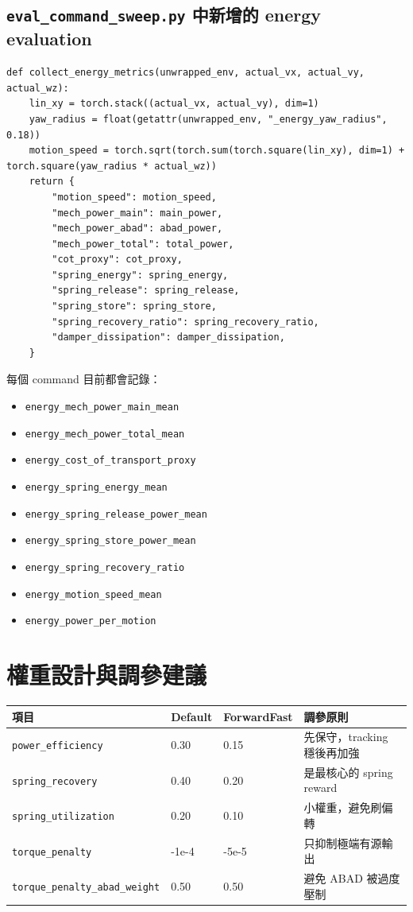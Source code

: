 \documentclass[12pt,a4paper,UTF8]{ctexart}
\begin{document}
\subsection{\texttt{eval\_command\_sweep.py} 中新增的 energy evaluation}

\begin{lstlisting}[style=pythonstyle,caption={energy KPI 收集 helper}]
def collect_energy_metrics(unwrapped_env, actual_vx, actual_vy, actual_wz):
    lin_xy = torch.stack((actual_vx, actual_vy), dim=1)
    yaw_radius = float(getattr(unwrapped_env, "_energy_yaw_radius", 0.18))
    motion_speed = torch.sqrt(torch.sum(torch.square(lin_xy), dim=1) + torch.square(yaw_radius * actual_wz))
    return {
        "motion_speed": motion_speed,
        "mech_power_main": main_power,
        "mech_power_abad": abad_power,
        "mech_power_total": total_power,
        "cot_proxy": cot_proxy,
        "spring_energy": spring_energy,
        "spring_release": spring_release,
        "spring_store": spring_store,
        "spring_recovery_ratio": spring_recovery_ratio,
        "damper_dissipation": damper_dissipation,
    }
\end{lstlisting}

每個 command 目前都會記錄：
\begin{itemize}[leftmargin=2em]
    \item \texttt{energy\_mech\_power\_main\_mean}
    \item \texttt{energy\_mech\_power\_total\_mean}
    \item \texttt{energy\_cost\_of\_transport\_proxy}
    \item \texttt{energy\_spring\_energy\_mean}
    \item \texttt{energy\_spring\_release\_power\_mean}
    \item \texttt{energy\_spring\_store\_power\_mean}
    \item \texttt{energy\_spring\_recovery\_ratio}
    \item \texttt{energy\_motion\_speed\_mean}
    \item \texttt{energy\_power\_per\_motion}
\end{itemize}

\section{權重設計與調參建議}

\begin{longtable}{p{4cm}p{2cm}p{2cm}p{6cm}}
\toprule
項目 & Default & ForwardFast & 調參原則 \\
\midrule
\texttt{power\_efficiency} & 0.30 & 0.15 & 先保守，tracking 穩後再加強 \\
\texttt{spring\_recovery} & 0.40 & 0.20 & 是最核心的 spring reward \\
\texttt{spring\_utilization} & 0.20 & 0.10 & 小權重，避免刷偏轉 \\
\texttt{torque\_penalty} & -1e-4 & -5e-5 & 只抑制極端有源輸出 \\
\texttt{torque\_penalty\_abad\_weight} & 0.50 & 0.50 & 避免 ABAD 被過度壓制 \\
\bottomrule
\end{longtable}
\end{document}
